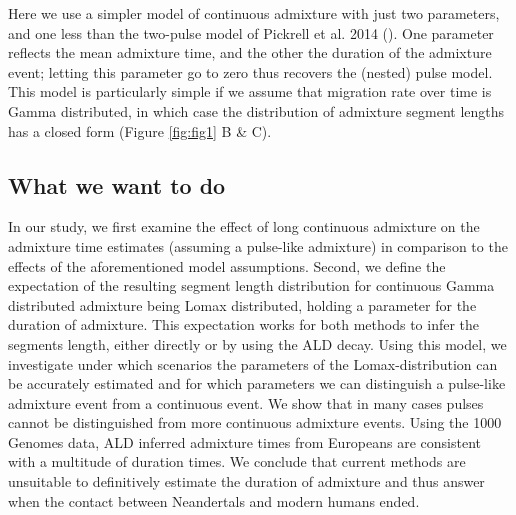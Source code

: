 \documentclass[]{article}
\begin{document}
Here we use a simpler model of continuous admixture with just two parameters, and one less than the two-pulse model of Pickrell et al. 2014 (\cite{pickrell_ancient_2014}). One parameter reflects the mean admixture time, and the other the duration of the admixture event; letting this parameter go to zero thus recovers the (nested) pulse model. 
This model is particularly simple if we assume that migration rate over time is Gamma distributed, in which case the distribution of admixture segment lengths has a closed form (Figure \ref{fig:fig1} B & C).

\subsection{What we want to do}\label{what-we-want-to-do}
In our  study, we first examine the  effect of long
continuous admixture on the admixture time estimates (assuming a pulse-like admixture) in comparison to
the effects of the aforementioned model assumptions. Second, we define
the expectation of the resulting segment length distribution for
continuous Gamma distributed admixture being Lomax distributed, holding
a parameter for the duration of admixture. This expectation works for
both methods to infer the segments length, either directly or by using
the ALD decay. Using this model, we investigate under which scenarios
the parameters of the Lomax-distribution can be accurately estimated and
for which parameters we can distinguish a pulse-like admixture event
from a continuous event. We show that in many cases pulses cannot be
distinguished from more continuous admixture events. Using the 1000 Genomes data, ALD inferred admixture times from Europeans are consistent with a multitude of duration times.
We conclude that current
methods are unsuitable to definitively estimate the duration of admixture and thus answer when the contact between
Neandertals and modern humans ended.
\end{document}
